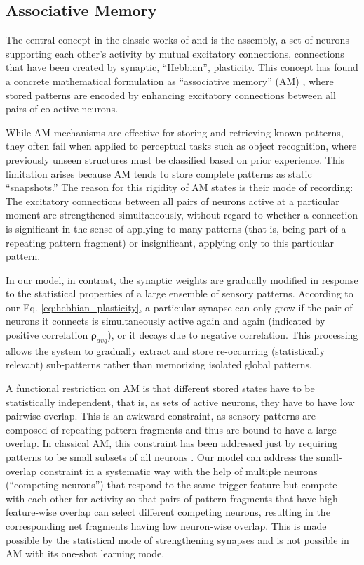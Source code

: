 \documentclass[12pt]{article}
\begin{document}
\subsection{Associative Memory} \label{sec:associative_memory}

The central concept in the classic works of \cite{hebb_organization_1949}  and \cite{hayek} is the assembly, a set of neurons supporting each other's activity by mutual excitatory connections, connections that have been created by synaptic, ``Hebbian'', plasticity.  This concept has found a concrete mathematical formulation as ``associative memory'' (AM) \citep{amari_learning_1972, Hopfield1982}, where stored patterns are encoded by enhancing excitatory connections between all pairs of co-active neurons.

While AM mechanisms are effective for storing and retrieving known patterns, they often fail when applied to perceptual tasks such as object recognition, where previously unseen structures must be classified based on prior experience.
This limitation arises because AM tends to store complete patterns as static ``snapshots.'' 
The reason for this rigidity of AM states is their mode of recording: The excitatory connections between all pairs of neurons active at a particular moment are strengthened simultaneously, without regard to whether a connection is significant in the sense of applying to many patterns (that is, being part of a repeating pattern fragment) or insignificant, applying only to this particular pattern.
  
In our model, in contrast, the synaptic weights are gradually modified in response to the statistical properties of a large ensemble of sensory patterns. According to our Eq. \ref{eq:hebbian_plasticity}, a particular synapse can only grow if the pair of neurons it connects is simultaneously active again and again (indicated by positive correlation $\boldsymbol{\rho}_{avg}$), or it decays due to negative correlation.
This processing allows the system to gradually extract and store re-occurring (statistically relevant) sub-patterns rather than memorizing isolated global patterns.

A functional restriction on AM is that different stored states have to be statistically independent, that is, as sets of active neurons, they have to have low pairwise overlap. This is an awkward constraint, as sensory patterns are composed of repeating pattern fragments and thus are bound to have a large overlap. In classical AM, this constraint has been addressed just by requiring patterns to be small subsets of all neurons \citep{Tsodyks2007, Palm2013}. Our model can address the small-overlap constraint in a systematic way with the help of multiple neurons (``competing neurons'') that respond to the same trigger feature but compete with each other for activity so that pairs of pattern fragments that have high feature-wise overlap can select different competing neurons, resulting in the corresponding net fragments having low neuron-wise overlap. This is made possible by the statistical mode of strengthening synapses and is not possible in AM with its one-shot learning mode.
\end{document}
